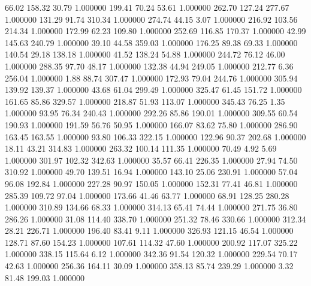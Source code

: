      66.02    158.32     30.79  1.000000
    199.41     70.24     53.61  1.000000
    262.70    127.24    277.67  1.000000
    131.29     91.74    310.34  1.000000
    274.74     44.15      3.07  1.000000
    216.92    103.56    214.34  1.000000
    172.99     62.23    109.80  1.000000
    252.69    116.85    170.37  1.000000
     42.99    145.63    240.79  1.000000
     39.10     44.58    359.03  1.000000
    176.25     89.38     69.33  1.000000
    140.54     29.18    138.18  1.000000
     41.52    138.24     54.88  1.000000
    244.72     76.12     46.00  1.000000
    288.35     97.70     48.17  1.000000
    132.38     44.94    249.05  1.000000
    212.77      6.36    256.04  1.000000
      1.88     88.74    307.47  1.000000
    172.93     79.04    244.76  1.000000
    305.94    139.92    139.37  1.000000
     43.68     61.04    299.49  1.000000
    325.47     61.45    151.72  1.000000
    161.65     85.86    329.57  1.000000
    218.87     51.93    113.07  1.000000
    345.43     76.25      1.35  1.000000
     93.95     76.34    240.43  1.000000
    292.26     85.86    190.01  1.000000
    309.55     60.54    190.93  1.000000
    191.59     56.76     50.95  1.000000
    166.07     83.62     75.80  1.000000
    286.90    163.45    163.55  1.000000
     93.80    106.33    322.15  1.000000
    122.96     90.37    202.68  1.000000
     18.11     43.21    314.83  1.000000
    263.32    100.14    111.35  1.000000
     70.49      4.92      5.69  1.000000
    301.97    102.32    342.63  1.000000
     35.57     66.41    226.35  1.000000
     27.94     74.50    310.92  1.000000
     49.70    139.51     16.94  1.000000
    143.10     25.06    230.91  1.000000
     57.04     96.08    192.84  1.000000
    227.28     90.97    150.05  1.000000
    152.31     77.41     46.81  1.000000
    285.39    109.72     97.04  1.000000
    173.66     41.46     63.77  1.000000
     68.91    128.25    280.28  1.000000
    310.89    134.66     68.33  1.000000
    314.13     65.41     74.44  1.000000
    271.75     36.80    286.26  1.000000
     31.08    114.40    338.70  1.000000
    251.32     78.46    330.66  1.000000
    312.34     28.21    226.71  1.000000
    196.40     83.41      9.11  1.000000
    326.93    121.15     46.54  1.000000
    128.71     87.60    154.23  1.000000
    107.61    114.32     47.60  1.000000
    200.92    117.07    325.22  1.000000
    338.15    115.64      6.12  1.000000
    342.36     91.54    120.32  1.000000
    229.54     70.17     42.63  1.000000
    256.36    164.11     30.09  1.000000
    358.13     85.74    239.29  1.000000
      3.32     81.48    199.03  1.000000
